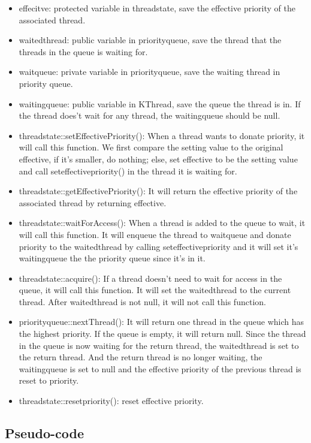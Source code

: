 \documentclass[a4paper,10pt]{article}
\begin{document}
\begin{itemize}
\item
effecitve: protected variable in threadstate, save the effective priority of the associated thread.
\item
waitedthread: public variable in priorityqueue, save the thread that the threads in the queue is waiting for.
\item
waitqueue: private variable in priorityqueue, save the waiting thread in priority queue.
\item
waitingqueue: public variable in KThread, save the queue the thread is in. If the thread does't wait for any thread, the waitingqueue should be null.
\item
threadstate::setEffectivePriority(): When a thread wants to donate priority, it will call this function. We first compare the setting value to the original effective, if it's smaller, do nothing; else, set effective to be the setting value and call seteffectivepriority() in the thread it is waiting for.
\item
threadstate::getEffectivePriority(): It will return the effective priority of the associated thread by returning effective.
\item
threadstate::waitForAccess():  When a thread is added to the queue to wait, it will call this function. It will enqueue the thread to waitqueue and donate priority to the waitedthread by calling seteffectivepriority and it will set it's waitingqueue the the priority queue since it's in it.
\item
threadstate::acquire(): If a thread doesn't need to wait for access in the queue, it will call this function. It will set the waitedthread to the current thread. After waitedthread is not null, it will not call this function.
\item
priorityqueue::nextThread(): It will return one thread in the queue which has the highest priority. If the queue is empty, it will return null. Since the thread in the queue is now waiting for the return thread, the waitedthread is set to the return thread. And the return thread is no longer waiting, the waitingqueue is set to null and the effective priority of the previous thread is reset to priority.
\item
threadstate::resetpriority(): reset effective priority.
\end{itemize}

\subsection{Pseudo-code}
\end{document}
